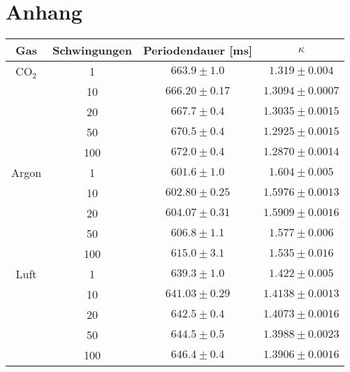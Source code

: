 \documentclass[12pt,a4paper,titlepage,headinclude,bibtotoc]{scrartcl}
\begin{document}
\section{Anhang}
\begin{table}[!htb]
	\centering
	\begin{tabular}{|c|c|c|c|}
		\hline
		Gas & Schwingungen & Periodendauer [ms] &$\kappa$\\
		\hline
		\hline
		CO$_2$
		& 1 & $663.9 \pm 1.0$ & $1.319 \pm 0.004$ \\
		& 10 & $666.20 \pm 0.17$ & $1.3094 \pm 0.0007$ \\
		& 20 & $667.7 \pm 0.4$ & $1.3035 \pm 0.0015$ \\
		& 50 & $670.5 \pm 0.4$ & $1.2925 \pm 0.0015$ \\
		& 100 & $672.0 \pm 0.4$ & $1.2870 \pm 0.0014$ \\
		\hline
		Argon
		& 1 & $601.6 \pm 1.0$ & $1.604 \pm 0.005$ \\
		& 10 & $602.80 \pm 0.25$ & $1.5976 \pm 0.0013$ \\
		& 20 & $604.07 \pm 0.31$ & $1.5909 \pm 0.0016$ \\
		& 50 & $606.8 \pm 1.1$ & $1.577 \pm 0.006$ \\
		& 100 & $615.0 \pm 3.1$ & $1.535 \pm 0.016$ \\
		\hline		
		Luft
		& 1 & $639.3 \pm 1.0$ & $1.422 \pm 0.005$ \\
		& 10 & $641.03 \pm 0.29$ & $1.4138 \pm 0.0013$ \\
		& 20 & $642.5 \pm 0.4$ & $1.4073 \pm 0.0016$ \\
		& 50 & $644.5 \pm 0.5$ & $1.3988 \pm 0.0023$ \\
		& 100 & $646.4 \pm 0.4$ & $1.3906 \pm 0.0016$ \\
		\hline
	\end{tabular}
\end{table}



\end{document}
